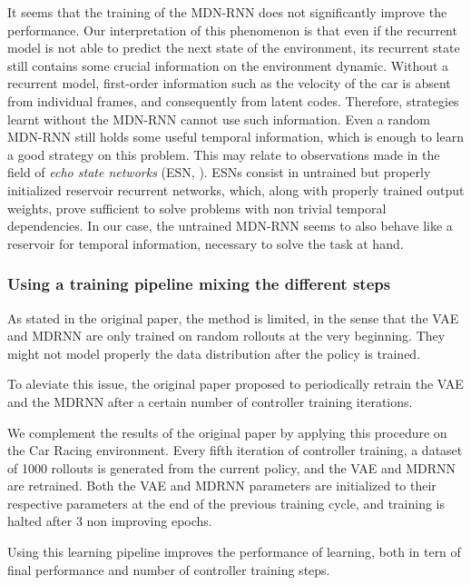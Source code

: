 \documentclass[10pt,a4paper,onecolumn]{article}
\begin{document}
It seems that the training of the MDN-RNN does not significantly improve
the performance. Our interpretation of this phenomenon is that even if
the recurrent model is not able to predict the next state of the
environment, its recurrent state still contains some crucial information
on the environment dynamic. Without a recurrent model, first-order
information such as the velocity of the car is absent from individual
frames, and consequently from latent codes. Therefore, strategies learnt
without the MDN-RNN cannot use such information. Even a random MDN-RNN
still holds some useful temporal information, which is enough to learn a
good strategy on this problem. This may relate to observations made in
the field of \emph{echo state networks} (ESN, \textcite{jaeger-tuto}).
ESNs consist in untrained but properly initialized reservoir recurrent
networks, which, along with properly trained output weights, prove
sufficient to solve problems with non trivial temporal dependencies. In
our case, the untrained MDN-RNN seems to also behave like a reservoir
for temporal information, necessary to solve the task at hand.

\hypertarget{using-a-training-pipeline-mixing-the-different-steps}{%
\subsubsection{Using a training pipeline mixing the different
steps}\label{using-a-training-pipeline-mixing-the-different-steps}}

As stated in the original paper, the method is limited, in the sense
that the VAE and MDRNN are only trained on random rollouts at the very
beginning. They might not model properly the data distribution after the
policy is trained.

To aleviate this issue, the original paper proposed to periodically
retrain the VAE and the MDRNN after a certain number of controller
training iterations.

We complement the results of the original paper by applying this
procedure on the Car Racing environment. Every fifth iteration of
controller training, a dataset of 1000 rollouts is generated from the
current policy, and the VAE and MDRNN are retrained. Both the VAE and
MDRNN parameters are initialized to their respective parameters at the
end of the previous training cycle, and training is halted after 3 non
improving epochs.

Using this learning pipeline improves the performance of learning, both
in tern of final performance and number of controller training steps.
\end{document}
